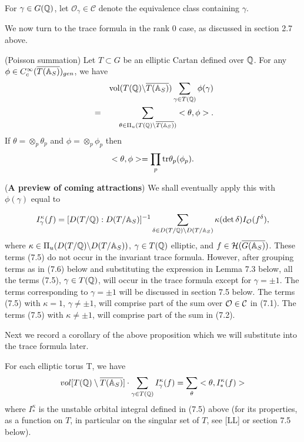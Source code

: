 For $\gamma \in G(\mathbb{Q} )$, let
${\mathcal{O}}_\gamma \in {\mathcal{C}}$ denote
the equivalence class containing $\gamma $. 

We now turn to the trace formula in the rank $0$ case, as discussed in
section 2.7 above.

\begin{proposition} (Poisson summation)
Let $T\subset G$ be an elliptic Cartan defined over $\mathbb{Q} $. For any
$\phi \in C_c^\infty (\overline{T(\mathbb{A} _S)})_{gen}$, we have 
\begin{eqnarray*}
&&{\mathrm{vol}}(T(\mathbb{Q} )\backslash \overline{T(\mathbb{A} _S)})
\sum_{\gamma \in T(\mathbb{Q} )}\phi (\gamma ) \\
&=&\sum_{\theta \in \Pi _u(T(\mathbb{Q} )\backslash \overline{T(\mathbb{A} _S)})}
<\theta,\phi>.
\end{eqnarray*}
If $\theta =\otimes _p\theta _p$ and $\phi=\otimes _p \phi_p$ then 
\[
<\theta ,\phi>=\prod_p{\rm tr}\theta _p(\phi_p).
\]
\end{proposition}

\begin{remark}
({\bf A preview of coming attractions})
We shall eventually apply this with $\phi (\gamma )$ equal to

\begin{equation}
I_\gamma ^\kappa (f)=
[D(T/\mathbb{Q} ): D(T/\mathbb{A} _S)]^{-1}
\sum_{\delta\in
D(T/\mathbb{Q} )\backslash D(T/\mathbb{A} _S)}
\kappa (\det \delta)I_{\cal{O}}(f^\delta),
\end{equation}
where $\kappa \in \Pi _u(D(T/\mathbb{Q} )\backslash D(T/\mathbb{A} _S))$,
$\gamma\in T(\mathbb{Q} )$ elliptic, and
$f\in {\cal H}(\overline{G(\mathbb{A} _S)})$.
These terms (7.5) do not occur in the invariant trace formula.
However, after grouping terms as in (7.6) below and substituting
the expression in Lemma 7.3 below, all the terms (7.5),
$\gamma\in T(\mathbb{Q} )$, will occur in the trace formula
except for $\gamma =\pm 1$. The terms corresponding to
$\gamma =\pm 1$ will be discussed in section 7.5 below.
The terms (7.5) with $\kappa = 1$, $\gamma\not= \pm 1$,
will comprise part of the sum over
${\cal{O}}\in {\cal{C}}$ in (7.1). The
terms (7.5) with $\kappa \not= \pm 1$,
will comprise part of the sum in (7.2).  
\end{remark}

Next we record a corollary of the above proposition 
which we will substitute into the trace formula later.

\begin{corollary}
For each elliptic torus T, we have 
\[
vol[T(\mathbb{Q} )\setminus \overline{T(\mathbb{A} _S)}]\cdot
\sum_{\gamma \in T({\mathbb Q})}
I_\gamma ^\kappa (f)=\sum_\theta <\theta ,I_{*}^\kappa (f)>
\]
where $I_{*}^\kappa $ is the unstable orbital integral defined in (7.5)
above (for its properties, as a function on $T$, in particular on the
singular set of $T$, see [LL] or section 7.5 below).
\end{corollary}

